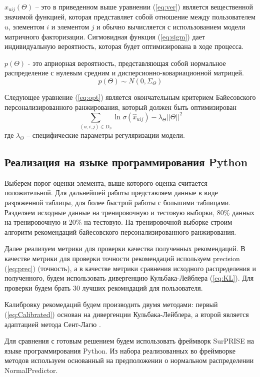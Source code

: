 ${\hat x_{uij}(\Theta)}$ -- это в приведенном выше уравнении (\ref{eq:ver}) является 
вещественной значимой функцией, которая представляет собой отношение 
между пользователем $u$, элементом $i$ и элементом $j$ и обычно вычисляется 
с использованием модели матричного факторизации. Сигмовидная 
функция (\ref{eq:sigm}) дает индивидуальную вероятность, которая будет оптимизирована в 
ходе процесса.

${p(\Theta)}$ - это априорная вероятность, представляющая собой нормальное 
распределение с нулевым средним и дисперсионно-ковариационной матрицей.
\begin{equation}
    p(\Theta) \sim N(0, \Sigma_{\Theta})
    \label{eq:apr}
  \end{equation} 

  Следующее уравнение (\ref{eq:opt}) является окончательным критерием Байесовского
  персонализированного ранжирования, который должен быть оптимизирован
  \begin{equation}
    \sum_{(u,i,j)\in D_S} \ln \sigma(\hat x_{uij}) - \lambda_\Theta||\Theta||^2
    \label{eq:opt}
  \end{equation} 
  где $\lambda_\Theta$ -- специфические параметры регуляризации модели.

  \subsection{Реализация на языке программирования Python}
  Выберем порог оценки элемента, выше которого оценка считается положительной.
  Для дальнейшей работы представляем данные в виде разряженной таблицы, для более быстрой работы с большими таблицами.
  Разделяем исходные данные на тренировочную и тестовую выборки, 80\% данных на 
  тренировочную и 20\% на тестовую. На тренировочной выборке строим алгоритм рекомендаций байесовского
  персонализированного ранжирования.

  Далее реализуем метрики для проверки качества полученных рекомендаций.
  В качестве метрики для проверки точности рекомендаций используем precision (\ref{eq:prec}) (точность),
  а в качестве метрики сравнения исходного распределения и полученного, будем использовать
  дивергенцию Кульбака-Лейблера (\ref{eq:KL}). Для проверки будем брать
  30 лучших рекомндаций для пользователя.

  Калибровку рекомедаций будем производить двумя методами: первый (\ref{eq:Calibrated})
  основан на дивергенции Кульбака-Лейблера, а второй является 
  адаптацией метода Сент-Лагю \cite{bib5}.

Для сравнения с готовым решением будем использовать фреймворк SurPRISE \cite{sur} на языке программирования Python.
Из набора реализованных во фреймворке методов используем основанный на предположении о нормальном распределении NormalPredictor.
